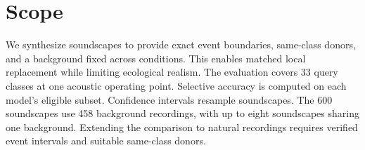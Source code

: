 \section{Scope}
\label{sec:limitations}

We synthesize soundscapes to provide exact event boundaries, same-class
donors, and a background fixed across conditions. This enables matched local
replacement while limiting ecological realism. The evaluation covers 33 query
classes at one acoustic operating point. Selective accuracy is computed on
each model's eligible subset. Confidence intervals resample soundscapes. The 600 soundscapes use 458
background recordings, with up to eight soundscapes sharing one background. Extending the comparison to
natural recordings requires verified event intervals and suitable same-class
donors.
